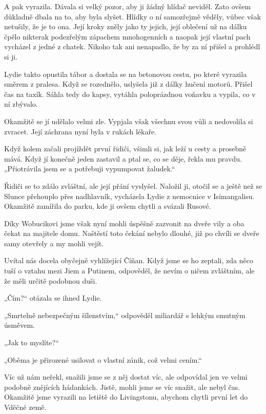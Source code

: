 A pak vyrazila. Dávala si velký pozor, aby ji žádný hlídač neviděl. Zato ovšem důkladně dbala na to, aby byla slyšet. Hlídky o ní samozřejmě věděly, vůbec však netušily, že je to ona. Její kroky zněly jako ty jejich, její oblečení už na dálku čpělo nikterak podezřelým zápachem mnohogenních a naopak její vlastní pach vycházel z jedné z chatek. Nikoho tak ani nenapadlo, že by za ní přišel a prohlédl si ji.

Lydie takto opustila tábor a dostala se na betonovou cestu, po které vyrazila směrem z pralesa. Když se rozednělo, uslyšela již z dálky hučení motorů. Přišel čas na taxík. Sáhla tedy do kapsy, vytáhla poloprázdnou voňavku a vypila, co v ní zbývalo.

Okamžitě se jí udělalo velmi zle. Vypjala však všechnu svou vůli a nedovolila si zvracet. Její záchrana nyní byla v rukách lékaře. 

Když kolem začali projíždět první řidiči, všimli si, jak leží u cesty a prosebně mává. Když jí konečně jeden zastavil a ptal se, co se děje, řekla mu pravdu. „Přiotrávila jsem se a potřebuji vypumpovat žaludek.“

Řidiči se to zdálo zvláštní, ale její přání vyslyšel. Naložil ji, otočil se a ještě než se Slunce přehouplo přes nadhlavník, vycházela Lydie z nemocnice v Isimangalisu. Okamžitě zamířila do parku, kde ji ovšem chytli a svázali Rusové.

Díky Wobucikovi jsme však nyní mohli úspěšně zazvonit na dveře vily a oba čekat na majitele domu. Naštěstí toto čekání nebylo dlouhé, již po chvíli se dveře samy otevřely a my mohli vejít.

Uvítal nás docela obyčejně vyhlížející Číňan. Když jsme se ho zeptali, zda něco tuší o vztahu mezi Jiem a Putinem, odpověděl, že nevím o ničem zvláštním, ale že měli určitě podobnou duši.

„Čím?“ otázala se ihned Lydie.

„Smrtelně nebezpečným šílenstvím,“ odpověděl miliardář s lehkým smutným úsměvem.

„Jak to myslíte?“

„Oběma je přirozené usilovat o vlastní zánik, což velmi cením.“ 

Víc už nám neřekl, snažili jsme se z něj dostat víc, ale odpovídal jen ve velmi podobně znějících hádankách. Jistě, mohli jsme se víc snažit, ale nebyl čas. Okamžitě jsme vyrazili na letiště do Livingstonu, abychom chytli první let do Vděčné země.
